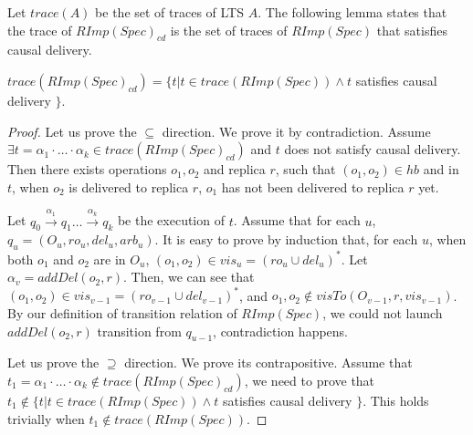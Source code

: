 Let $\mathit{trace}(A)$ be the set of traces of LTS $A$. The following lemma states that the trace of $\mathit{RImp}(\mathit{Spec})_{\mathit{cd}}$ is the set of traces of $\mathit{RImp}(\mathit{Spec})$ that satisfies causal delivery.

\begin{lemma}
\label{lemma:RImpcdSpec contains all the sequences of RImpSpec that are causal delivery}
$\mathit{trace}( \mathit{RImp}(\mathit{Spec})_{\mathit{cd}} ) = \{ t \vert t \in \mathit{trace}( \mathit{RImp}(\mathit{Spec}) ) \wedge t$ satisfies causal delivery $\}$.
\end{lemma}

\begin {proof}

Let us prove the $\subseteq$ direction. We prove it by contradiction. Assume $\exists t =\alpha_1 \cdot \ldots \cdot \alpha_k \in \mathit{trace}( \mathit{RImp}(\mathit{Spec})_{\mathit{cd}} )$ and $t$ does not satisfy causal delivery. Then there exists operations $o_1,o_2$ and replica $r$, such that $(o_1,o_2) \in \mathit{hb}$ and in $t$, when $o_2$ is delivered to replica $r$, $o_1$ has not been delivered to replica $r$ yet.

Let $q_0 {\xrightarrow{\alpha_1}} q_1 \ldots {\xrightarrow{\alpha_k}} q_k$ be the execution of $t$. Assume that for each $u$, $q_u = (O_u,\mathit{ro}_u,\mathit{del}_u,\mathit{arb}_u)$. It is easy to prove by induction that, for each $u$, when both $o_1$ and $o_2$ are in $O_u$, $(o_1,o_2) \in \mathit{vis}_u = (\mathit{ro}_u \cup \mathit{del}_u)^*$. Let $\alpha_v = \mathit{addDel}(o_2,r)$. Then, we can see that $(o_1,o_2) \in \mathit{vis}_{v-1} = (\mathit{ro}_{v-1} \cup \mathit{del}_{v-1})^*$, and $o_1,o_2 \notin \mathit{visTo}(O_{v-1},r,\mathit{vis}_{v-1})$. By our definition of transition relation of $\mathit{RImp}(\mathit{Spec})$, we could not launch $\mathit{addDel}(o_2,r)$ transition from $q_{u-1}$, contradiction happens.

Let us prove the $\supseteq$ direction. We prove its contrapositive. Assume that $t_1 =\alpha_1 \cdot \ldots \cdot \alpha_k \notin \mathit{trace}( \mathit{RImp}(\mathit{Spec})_{\mathit{cd}} )$, we need to prove that $t_1 \notin \{ t \vert t \in \mathit{trace}( \mathit{RImp}(\mathit{Spec}) ) \wedge t$ satisfies causal delivery $\}$. This holds trivially when $t_1 \notin \mathit{trace}( \mathit{RImp}(\mathit{Spec}) )$.


\end{proof}
